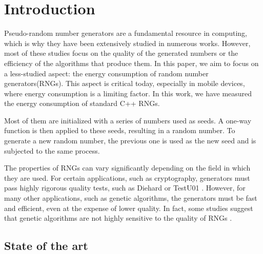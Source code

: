 \documentclass[dvipsnames,format=sigconf,anonymous=true,review=true]{acmart}
\begin{document}


\maketitle

\section{Introduction}
\label{sec:introduction}

Pseudo-random number generators \cite{marsaglia2003random} are a fundamental resource in computing, which is why they have been extensively studied in numerous works. However, most of these studies focus on the quality of the generated numbers or the efficiency of the algorithms that produce them. In this paper, we aim to focus on a less-studied aspect: the energy consumption of random number generators(RNGs). This aspect is critical today, especially in mobile devices, where energy consumption is a limiting factor. In this work, we have measured the energy consumption of standard C++ RNGs.

Most of them are initialized with a series of numbers used as seeds. A one-way function is then applied to these seeds, resulting in a random number. To generate a new random number, the previous one is used as the new seed and is subjected to the same process.

The properties of RNGs can vary significantly depending on the field in which they are used. For certain applications, such as cryptography, generators must pass highly rigorous quality tests, such as Diehard \cite{marsaglia1997diehard} or TestU01 \cite{testu01}. However, for many other applications, such as genetic algorithms, the generators must be fast and efficient, even at the expense of lower quality. In fact, some studies suggest that genetic algorithms are not highly sensitive to the quality of RNGs \cite{cardenas2011sensitiveness}.

\subsection{State of the art}
\label{sec:state-of-the-art}
\end{document}
